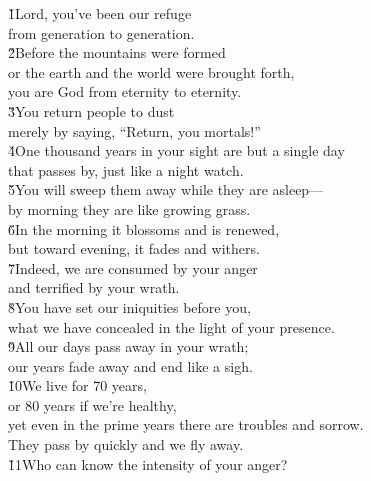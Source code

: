 \begin{poetry}
\poeml \v{1}Lord, you've been our refuge \\
\poemll    from generation to generation. \\
\poeml \v{2}Before the mountains were formed \\
\poemll    or the earth and the world were brought forth, \\
\poemlll       you are God from eternity to eternity. \\
\poeml \v{3}You return people to dust \\
\poemll    merely by saying, ``Return, you mortals!'' \\
\poeml \v{4}One thousand years in your sight are but a single day \\
\poemll    that passes by, just like a night watch. \\
\poeml \v{5}You will sweep them away while they are asleep--- \\
\poemll    by morning they are like growing grass. \\
\poeml \v{6}In the morning it blossoms and is renewed, \\
\poemll    but toward evening, it fades and withers. \\
\poeml \v{7}Indeed, we are consumed by your anger \\
\poemll    and terrified by your wrath. \\
\poeml \v{8}You have set our iniquities before you, \\
\poemll    what we have concealed in the light of your presence. \\
\poeml \v{9}All our days pass away in your wrath; \\
\poemll    our years fade away and end like a sigh. \\
\poeml \v{10}We live for 70 years, \\
\poemll    or 80 years if we're healthy, \\
\poeml yet even in the prime years there are troubles and sorrow. \\
\poemll    They pass by quickly and we fly away. \\
\poeml \v{11}Who can know the intensity of your anger? \\

\end{poetry}
